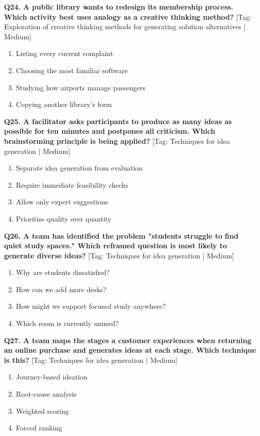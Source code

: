 \noindent\textbf{Q24. A public library wants to redesign its membership process. Which activity best uses analogy as a creative thinking method?} \hfill [Tag: Exploration of creative thinking methods for generating solution alternatives | Medium]
\begin{enumerate}[label=(\alph*),topsep=2pt,itemsep=1pt,partopsep=0pt,parsep=0pt]
    \item {Listing every current complaint}
    \item {Choosing the most familiar software}
    \item {Studying how airports manage passengers}
    \item {Copying another library's form}
\end{enumerate}
\vspace{2mm}

\noindent\textbf{Q25. A facilitator asks participants to produce as many ideas as possible for ten minutes and postpones all criticism. Which brainstorming principle is being applied?} \hfill [Tag: Techniques for idea generation | Medium]
\begin{enumerate}[label=(\alph*),topsep=2pt,itemsep=1pt,partopsep=0pt,parsep=0pt]
    \item {Separate idea generation from evaluation}
    \item {Require immediate feasibility checks}
    \item {Allow only expert suggestions}
    \item {Prioritise quality over quantity}
\end{enumerate}
\vspace{2mm}

\noindent\textbf{Q26. A team has identified the problem "students struggle to find quiet study spaces." Which reframed question is most likely to generate diverse ideas?} \hfill [Tag: Techniques for idea generation | Medium]
\begin{enumerate}[label=(\alph*),topsep=2pt,itemsep=1pt,partopsep=0pt,parsep=0pt]
    \item {Why are students dissatisfied?}
    \item {How can we add more desks?}
    \item {How might we support focused study anywhere?}
    \item {Which room is currently unused?}
\end{enumerate}
\vspace{2mm}

\noindent\textbf{Q27. A team maps the stages a customer experiences when returning an online purchase and generates ideas at each stage. Which technique is this?} \hfill [Tag: Techniques for idea generation | Medium]
\begin{enumerate}[label=(\alph*),topsep=2pt,itemsep=1pt,partopsep=0pt,parsep=0pt]
    \item {Journey-based ideation}
    \item {Root-cause analysis}
    \item {Weighted scoring}
    \item {Forced ranking}
\end{enumerate}
\vspace{2mm}

